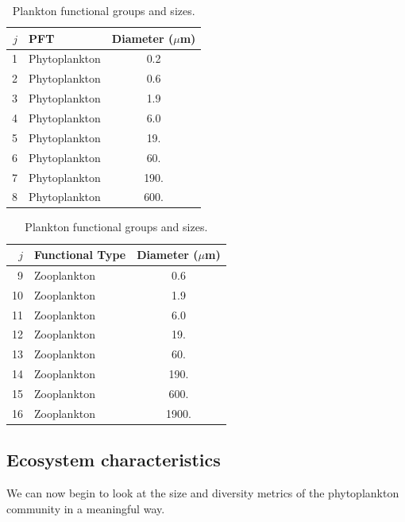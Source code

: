 \documentclass[11pt,fleqn]{book} %
\begin{document}
\begin{table}[htp!]
\begin{center}
\caption{Plankton functional groups and sizes.}
\begin{tabular}{rlc}
\hline
$j$     & PFT                   & \multicolumn{1}{r}{Diameter ($\mu$m)}  \\
\hline
1       & Phytoplankton         & 0.2  \\
2       & Phytoplankton         & 0.6  \\
3       & Phytoplankton         & 1.9  \\
4       & Phytoplankton         & 6.0  \\
5       & Phytoplankton         & 19.  \\
6       & Phytoplankton         & 60.  \\
7       & Phytoplankton         & 190.  \\
8       & Phytoplankton         & 600.  \\
\hline 
\end{tabular} 
\begin{tabular}{rlc}
\hline
$j$     & Functional Type       & \multicolumn{1}{r}{Diameter ($\mu$m)}  \\
\hline
9       & Zooplankton           & 0.6  \\
10      & Zooplankton           & 1.9  \\
11      & Zooplankton           & 6.0  \\
12      & Zooplankton           & 19.  \\
13      & Zooplankton           & 60.  \\
14      & Zooplankton           & 190.  \\
15      & Zooplankton           & 600.  \\
16      & Zooplankton           & 1900.  \\
\hline 
\end{tabular} 
\label{planktonconfig2}
\end{center}
\end{table}
\vspace{-4mm}


\subsection{Ecosystem characteristics} We can now begin to look at the size and diversity metrics of the phytoplankton community in a meaningful way.
\end{document}
